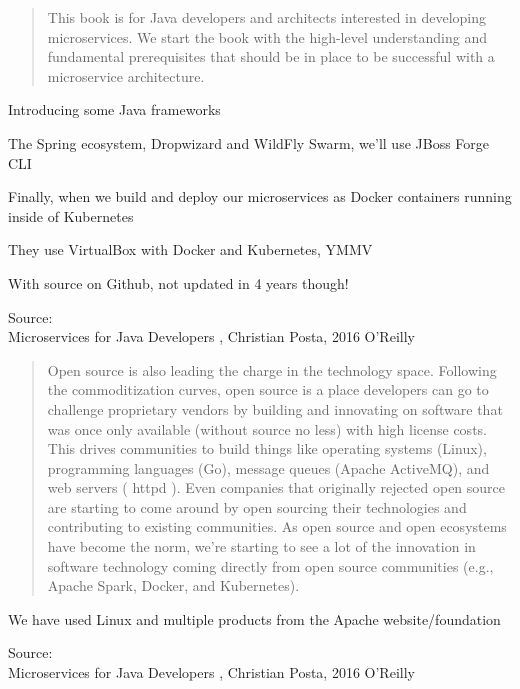 \documentclass[Screen16to9,17pt]{foils}
\begin{document}
\begin{quote}
This book is for Java developers and architects interested in developing microservices. We start the book with the high-level understanding and fundamental prerequisites that should be in place to be successful with a microservice architecture.
\end{quote}

Introducing some Java frameworks
\begin{list2}
\item The Spring ecosystem, Dropwizard and WildFly Swarm, we’ll use JBoss Forge CLI
\item Finally, when we build and deploy our microservices as Docker containers running inside of Kubernetes
\item They use VirtualBox with Docker and Kubernetes, YMMV
\item With source on Github, not updated in 4 years though!\\
\end{list2}
Source: {\footnotesize\\
Microservices for Java Developers , Christian Posta, 2016 O’Reilly}




\begin{quote}\small
Open source is also leading the charge in the technology space. Following the commoditization curves, open source is a place developers can go to challenge proprietary vendors by building and
  innovating on software that was once only available (without source
  no less) with high license costs. This drives communities to build
  things like operating systems (Linux), programming languages (Go),
  message queues (Apache ActiveMQ), and web servers ( httpd ). Even
  companies that originally rejected open source are starting to come
  around by open sourcing their technologies and contributing to
  existing communities. As open source and open ecosystems have
  become the norm, we’re starting to see a lot of the innovation in
  software technology coming directly from open source communities
  (e.g., Apache Spark, Docker, and Kubernetes).
\end{quote}

\begin{list2}
\item We have used Linux and multiple products from the Apache website/foundation
\end{list2}
Source: {\footnotesize\\
Microservices for Java Developers , Christian Posta, 2016 O’Reilly}
\end{document}
